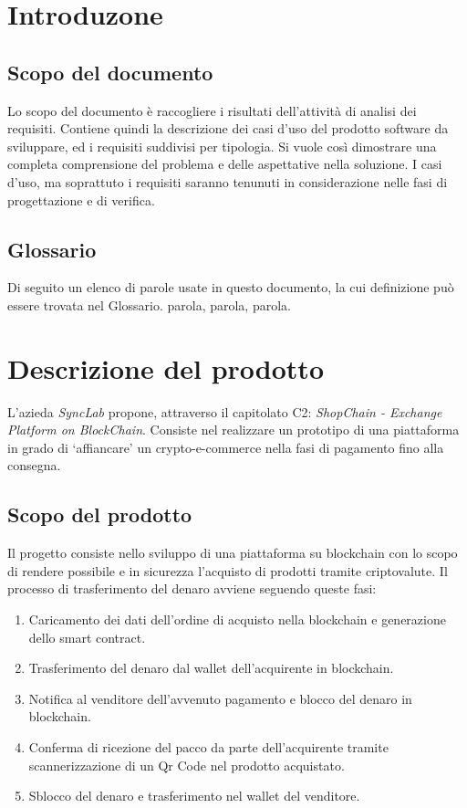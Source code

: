 \documentclass[a4paper, 12pt]{article}
\begin{document}
\makefrontpage

\makeversioni

\section{Introduzone}
\subsection{Scopo del documento}
Lo scopo del documento è raccogliere i risultati dell'attività di analisi dei requisiti. Contiene quindi la descrizione dei casi d'uso del prodotto software da sviluppare, ed i requisiti suddivisi per tipologia. Si vuole così dimostrare una completa comprensione del problema e delle aspettative  nella soluzione. I casi d'uso, ma soprattuto i requisiti saranno tenunuti in considerazione nelle fasi di progettazione e di verifica. 
\subsection{Glossario}
Di seguito un elenco di parole usate in questo documento, la cui definizione può essere trovata nel Glossario.
parola, parola, parola.

\section{Descrizione del prodotto}
L'azieda \textit{SyncLab} propone, attraverso il capitolato C2: \textit{ShopChain - Exchange Platform on
BlockChain}. Consiste nel realizzare un prototipo di una piattaforma in grado di ‘affiancare’ un crypto-e-commerce nella fasi di pagamento fino alla consegna.
\subsection{Scopo del prodotto}
Il progetto consiste nello sviluppo di una piattaforma su blockchain con lo scopo di rendere possibile e in sicurezza l'acquisto di prodotti tramite criptovalute. Il processo di trasferimento del denaro avviene seguendo queste fasi:
\begin{enumerate}
\item Caricamento dei dati dell'ordine di acquisto nella blockchain e generazione dello smart contract.
\item Trasferimento del denaro dal wallet dell'acquirente in blockchain.
\item Notifica al venditore dell'avvenuto pagamento e blocco del denaro in blockchain.
\item Conferma di ricezione del pacco da parte dell'acquirente tramite scannerizzazione di un Qr Code nel prodotto acquistato.
\item Sblocco del denaro e trasferimento nel wallet del venditore.
\end{enumerate}
\end{document}
